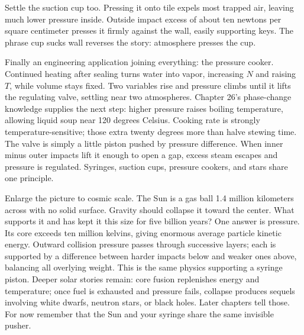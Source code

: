 Settle the suction cup too. Pressing it onto tile expels most trapped air, leaving much lower pressure inside. Outside impact excess of about ten newtons per square centimeter presses it firmly against the wall, easily supporting keys. The phrase cup sucks wall reverses the story: atmosphere presses the cup.

Finally an engineering application joining everything: the pressure cooker. Continued heating after sealing turns water into vapor, increasing \(N\) and raising \(T\), while volume stays fixed. Two variables rise and pressure climbs until it lifts the regulating valve, settling near two atmospheres. Chapter 26's phase-change knowledge supplies the next step: higher pressure raises boiling temperature, allowing liquid soup near 120 degrees Celsius. Cooking rate is strongly temperature-sensitive; those extra twenty degrees more than halve stewing time. The valve is simply a little piston pushed by pressure difference. When inner minus outer impacts lift it enough to open a gap, excess steam escapes and pressure is regulated. Syringes, suction cups, pressure cookers, and stars share one principle.


\begin{thought}
Enlarge the picture to cosmic scale. The Sun is a gas ball 1.4 million kilometers across with no solid surface. Gravity should collapse it toward the center. What supports it and has kept it this size for five billion years? One answer is pressure. Its core exceeds ten million kelvins, giving enormous average particle kinetic energy. Outward collision pressure passes through successive layers; each is supported by a difference between harder impacts below and weaker ones above, balancing all overlying weight. This is the same physics supporting a syringe piston. Deeper solar stories remain: core fusion replenishes energy and temperature; once fuel is exhausted and pressure fails, collapse produces sequels involving white dwarfs, neutron stars, or black holes. Later chapters tell those. For now remember that the Sun and your syringe share the same invisible pusher.
\end{thought}

